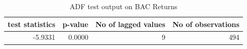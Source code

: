 \begin{table}[!ht] 
\centering 
\resizebox{0.7\textwidth}{!} { 
\begin{tabular}{rrrr}
\toprule
test statistics & p-value & No of lagged values & No of observations \\
\midrule
-5.9331 & 0.0000 & 9 & 494 \\
\bottomrule
\end{tabular}} 
\caption {ADF test output on BAC Returns} 
\label {adf_bac} 
\end{table} 
\FloatBarrier